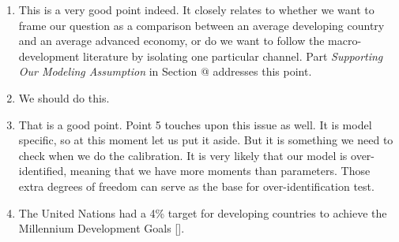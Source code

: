 \documentclass[twoside,11pt,leqno]{article}
\makeatletter
\newcommand*{\rom}[1]{\expandafter\@slowromancap\romannumeral #1@}
\makeatother
\begin{document}
\begin{enumerate}
    \item
    This is a very good point indeed. It closely relates to whether we want to frame our question as a comparison between an average developing country and an average advanced economy, or do we want to follow the macro-development literature by isolating one particular channel. Part \textit{Supporting Our Modeling Assumption} in Section \rom{1} addresses this point.
    \item
    We should do this.
    \item
    That is a good point. Point 5 touches upon this issue as well. It is model specific, so at this moment let us put it aside. But it is something we need to check when we do the calibration. It is very likely that our model is over-identified, meaning that we have more moments than parameters. Those extra degrees of freedom can serve as the base for over-identification test.
    \item
    The United Nations had a 4\% target for developing countries to achieve the Millennium Development Goals [\citet{UN:2005}].
\end{enumerate}
\end{document}
